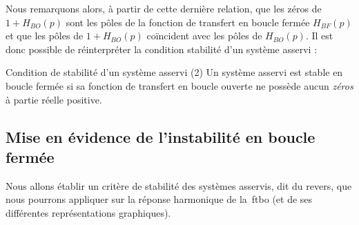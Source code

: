 Nous remarquons alors, à partir de cette dernière relation,
que les zéros de $1+H_{BO}(p)$ sont les pôles de la fonction de 
transfert en boucle fermée $H_{BF}(p)$ et que les pôles 
de $1+H_{BO}(p)$ co\"incident avec 
les pôles de $H_{BO}(p)$. Il est donc possible de 
réinterpréter la condition stabilité d'un système asservi :
\begin{criteria}{Condition de stabilité d'un système asservi (2)}
    Un système asservi est stable en boucle fermée si sa fonction 
    de transfert en boucle ouverte ne possède aucun \emph{zéros} à partie 
    réelle positive.
\end{criteria}
\subsection{Mise en évidence de l'instabilité en boucle fermée}
Nous allons établir un critère de stabilité des systèmes asservis, dit du revers, 
que nous pourrons appliquer sur la réponse harmonique de la~\gls{ftbo} 
(et de ses différentes représentations graphiques).

